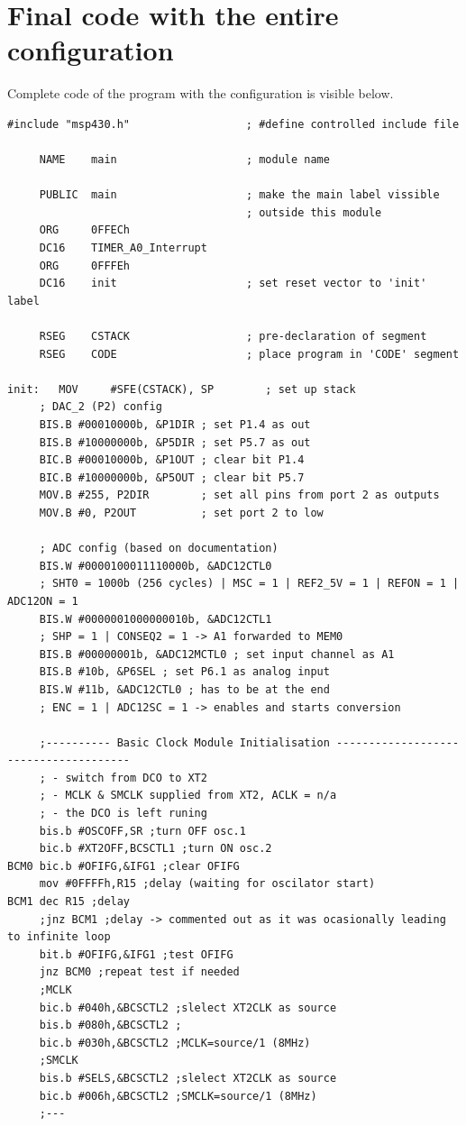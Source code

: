 \documentclass{article}
\begin{document}
\newpage
\section{Final code with the entire configuration}
Complete code of the program with the configuration is visible below.
\begin{verbatim}
#include "msp430.h"                  ; #define controlled include file
 
     NAME    main                    ; module name

     PUBLIC  main                    ; make the main label vissible
                                     ; outside this module
     ORG     0FFECh
     DC16    TIMER_A0_Interrupt
     ORG     0FFFEh                  
     DC16    init                    ; set reset vector to 'init' label

     RSEG    CSTACK                  ; pre-declaration of segment
     RSEG    CODE                    ; place program in 'CODE' segment

init:   MOV     #SFE(CSTACK), SP        ; set up stack
     ; DAC_2 (P2) config
     BIS.B #00010000b, &P1DIR ; set P1.4 as out
     BIS.B #10000000b, &P5DIR ; set P5.7 as out
     BIC.B #00010000b, &P1OUT ; clear bit P1.4
     BIC.B #10000000b, &P5OUT ; clear bit P5.7
     MOV.B #255, P2DIR        ; set all pins from port 2 as outputs
     MOV.B #0, P2OUT          ; set port 2 to low

     ; ADC config (based on documentation)
     BIS.W #0000100011110000b, &ADC12CTL0
     ; SHT0 = 1000b (256 cycles) | MSC = 1 | REF2_5V = 1 | REFON = 1 | ADC12ON = 1
     BIS.W #0000001000000010b, &ADC12CTL1
     ; SHP = 1 | CONSEQ2 = 1 -> A1 forwarded to MEM0
     BIS.B #00000001b, &ADC12MCTL0 ; set input channel as A1
     BIS.B #10b, &P6SEL ; set P6.1 as analog input
     BIS.W #11b, &ADC12CTL0 ; has to be at the end
     ; ENC = 1 | ADC12SC = 1 -> enables and starts conversion

     ;---------- Basic Clock Module Initialisation --------------------------------------
     ; - switch from DCO to XT2
     ; - MCLK & SMCLK supplied from XT2, ACLK = n/a
     ; - the DCO is left runing
     bis.b #OSCOFF,SR ;turn OFF osc.1
     bic.b #XT2OFF,BCSCTL1 ;turn ON osc.2
BCM0 bic.b #OFIFG,&IFG1 ;clear OFIFG
     mov #0FFFFh,R15 ;delay (waiting for oscilator start)
BCM1 dec R15 ;delay
     ;jnz BCM1 ;delay -> commented out as it was ocasionally leading to infinite loop
     bit.b #OFIFG,&IFG1 ;test OFIFG
     jnz BCM0 ;repeat test if needed
     ;MCLK
     bic.b #040h,&BCSCTL2 ;slelect XT2CLK as source
     bis.b #080h,&BCSCTL2 ;
     bic.b #030h,&BCSCTL2 ;MCLK=source/1 (8MHz)
     ;SMCLK
     bis.b #SELS,&BCSCTL2 ;slelect XT2CLK as source
     bic.b #006h,&BCSCTL2 ;SMCLK=source/1 (8MHz)
     ;---


\end{verbatim}
\end{document}
